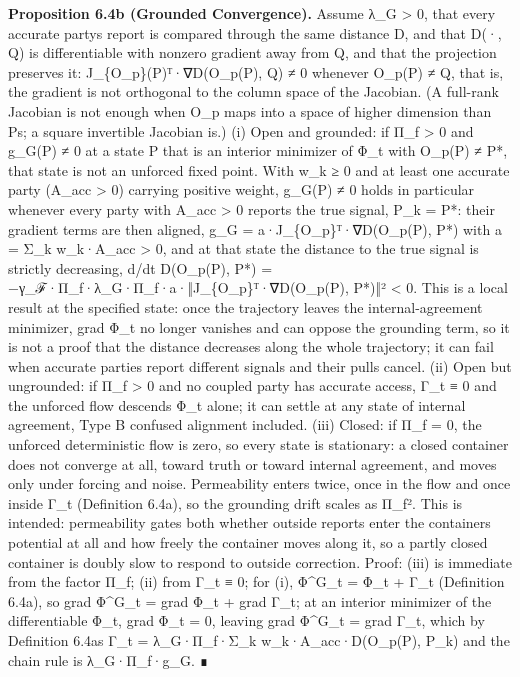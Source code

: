 \documentclass[
]{article}
\begin{document}
\textbf{Proposition 6.4b (Grounded Convergence).} Assume λ\_G
\textgreater{} 0, that every accurate party\textquotesingle s report is
compared through the same distance D, and that D(·, Q) is differentiable
with nonzero gradient away from Q, and that the projection preserves it:
J\_\{O\_p\}(P)ᵀ·∇D(O\_p(P), Q) ≠ 0 whenever O\_p(P) ≠ Q, that is, the
gradient is not orthogonal to the column space of the Jacobian. (A
full-rank Jacobian is not enough when O\_p maps into a space of higher
dimension than P\textquotesingle s; a square invertible Jacobian is.)
(i) Open and grounded: if Π\_f \textgreater{} 0 and g\_G(P) ≠ 0 at a
state P that is an interior minimizer of Φ\_t with O\_p(P) ≠ P*, that
state is not an unforced fixed point. With w\_k ≥ 0 and at least one
accurate party (A\_acc \textgreater{} 0) carrying positive weight,
g\_G(P) ≠ 0 holds in particular whenever every party with A\_acc
\textgreater{} 0 reports the true signal, P\_k = P*: their gradient
terms are then aligned, g\_G = a·J\_\{O\_p\}ᵀ·∇D(O\_p(P), P*) with a =
Σ\_k w\_k·A\_acc \textgreater{} 0, and at that state the distance to the
true signal is strictly decreasing, d/dt D(O\_p(P), P*) =
−γ\_ℱ·Π\_f·λ\_G·Π\_f·a·‖J\_\{O\_p\}ᵀ·∇D(O\_p(P), P*)‖² \textless{} 0.
This is a local result at the specified state: once the trajectory
leaves the internal-agreement minimizer, grad Φ\_t no longer vanishes
and can oppose the grounding term, so it is not a proof that the
distance decreases along the whole trajectory; it can fail when accurate
parties report different signals and their pulls cancel. (ii) Open but
ungrounded: if Π\_f \textgreater{} 0 and no coupled party has accurate
access, Γ\_t ≡ 0 and the unforced flow descends Φ\_t alone; it can
settle at any state of internal agreement, Type B confused alignment
included. (iii) Closed: if Π\_f = 0, the unforced deterministic flow is
zero, so every state is stationary: a closed container does not converge
at all, toward truth or toward internal agreement, and moves only under
forcing and noise. Permeability enters twice, once in the flow and once
inside Γ\_t (Definition 6.4a), so the grounding drift scales as Π\_f².
This is intended: permeability gates both whether outside reports enter
the container\textquotesingle s potential at all and how freely the
container moves along it, so a partly closed container is doubly slow to
respond to outside correction. Proof: (iii) is immediate from the factor
Π\_f; (ii) from Γ\_t ≡ 0; for (i), Φ\^{}G\_t = Φ\_t + Γ\_t (Definition
6.4a), so grad Φ\^{}G\_t = grad Φ\_t + grad Γ\_t; at an interior
minimizer of the differentiable Φ\_t, grad Φ\_t = 0, leaving grad
Φ\^{}G\_t = grad Γ\_t, which by Definition 6.4a\textquotesingle s Γ\_t =
λ\_G·Π\_f·Σ\_k w\_k·A\_acc·D(O\_p(P), P\_k) and the chain rule is
λ\_G·Π\_f·g\_G. ∎
\end{document}
